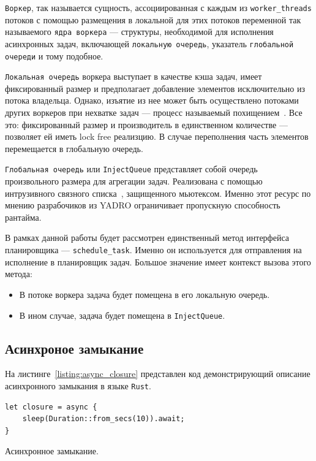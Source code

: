 \verb|Воркер|, так называется сущность, ассоциированная с каждым из \verb|worker_threads| потоков с помощью размещения в локальной для этих потоков переменной так называемого \verb|ядра воркера| --- структуры, необходимой для исполнения асинхронных задач, включающей \verb|локальную очередь|, указатель \verb|глобальной очереди| и тому подобное.

\verb|Локальная очередь| воркера выступает в качестве кэша задач, имеет фиксированный размер и предполагает добавление элементов  исключительно из потока владельца. Однако, изъятие из нее может быть осуществлено потоками других воркеров при нехватке задач --- процесс называемый похищением~\cite{cringeTokioIOUring}. Все это: фиксированный размер и производитель в единственном количестве --- позволяет ей иметь lock free реализцию. В случае переполнения часть элементов перемещается в глобальную очередь.

\verb|Глобальная очередь| или \verb|InjectQueue| представляет собой очередь произвольного размера для агрегации задач. Реализована с помощью интрузивного связного списка~\cite{queues}, защищенного мьютексом. Именно этот ресурс по мнению разрабочиков из YADRO ограничивает пропускную способность рантайма.

В рамках данной работы будет рассмотрен единственный метод интерфейса планировщика --- \verb|schedule_task|. Именно он используется для отправления на исполнение в планировщик задач. Большое значение имеет контекст вызова этого метода:

\begin{itemize}
    \item В потоке воркера задача будет помещена в его локальную очередь.
    \item В ином случае, задача будет помещена в \verb|InjectQueue|.
\end{itemize}

\subsection{Асинхроное замыкание}

На листинге~\ref{listing:async_closure} представлен код демонстрирующий описание асинхронного замыкания в языке \verb|Rust|.

\begin{listing}[H]
    \begin{verbatim}
let closure = async {
    sleep(Duration::from_secs(10)).await;
}
    \end{verbatim}

    \caption{Асинхронное замыкание.}
    \label{listing:async_closure}
\end{listing}


